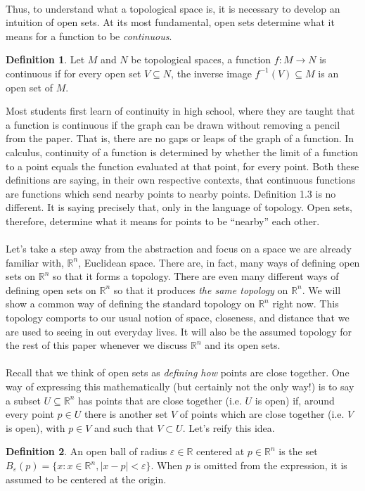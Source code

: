 \documentclass[]{article}
\let\epsilon\varepsilon
\newcommand\<{\ensuremath{\left\langle}}
\renewcommand\>{\ensuremath{\right\rangle}}
\newcommand{\RR}{\ensuremath{\mathbb{R}}}
\theoremstyle{definition}
\newtheorem{definition}{Definition}[section]
\theoremstyle{definition}
\begin{document}
	\\
	Thus, to understand what a topological space is, it is necessary to develop an intuition of open sets. At its most fundamental, open sets determine what it means for a function to be \textit{continuous}.
	\begin{definition}
		Let $M$ and $N$ be topological spaces, a function $f : M \to N$ is continuous if for every open set $V \subseteq N$, the inverse image $f^{-1}(V) \subseteq M$ is an open set of $M$.
	\end{definition} 
	Most students first learn of continuity in high school, where they are taught that a function is continuous if the graph can be drawn without removing a pencil from the paper. That is, there are no gaps or leaps of the graph of a function. In calculus, continuity of a function is determined by whether the limit of a function to a point equals the function evaluated at that point, for every point. Both these definitions are saying, in their own respective contexts, that continuous functions are functions which send nearby points to nearby points. Definition 1.3 is no different. It is saying precisely that, only in the language of topology. Open sets, therefore, determine what it means for points to be ``nearby'' each other.\\
	\\
	Let's take a step away from the abstraction and focus on a space we are already familiar with, $\RR^n$, Euclidean space. There are, in fact, many ways of defining open sets on $\RR^n$ so that it forms a topology. There are even many different ways of defining open sets on $\RR^n$ so that it produces \textit{the same topology} on $\RR^n$. We will show a common way of defining the standard topology on $\RR^n$ right now. This topology comports to our usual notion of space, closeness, and distance that we are used to seeing in out everyday lives. It will also be the assumed topology for the rest of this paper whenever we discuss $\RR^n$ and its open sets.
	\\
	\\
	Recall that we think of open sets as \textit{defining how} points are close together. One way of expressing this mathematically (but certainly not the only way!) is to say a subset $U \subseteq \RR^n$ has points that are close together (i.e. $U$ is open) if, around every point $p \in U$ there is another set $V$ of points which are close together (i.e. $V$ is open), with $p \in V$ and such that $V \subset U$. Let's reify this idea.
	\begin{definition}
		An open ball of radius $\varepsilon \in \RR$ centered at $p \in \RR^n$ is the set $B_\epsilon(p) = \{x : x \in \RR^n, |x - p| < \epsilon\}$. When $p$ is omitted from the expression, it is assumed to be centered at the origin.
	\end{definition}
\end{document}
